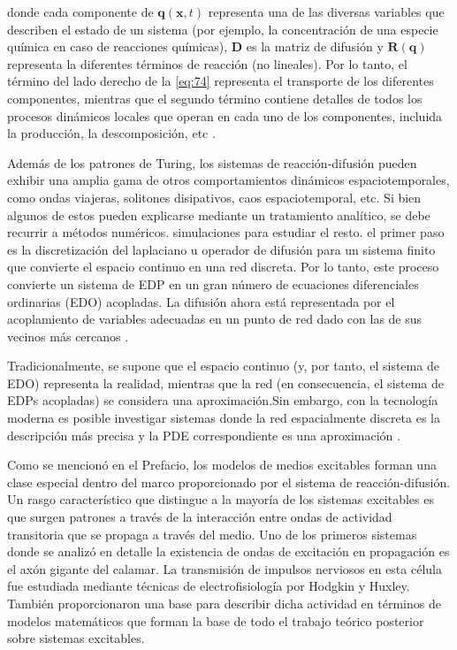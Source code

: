 donde cada componente de $\mathbf{q}(\mathbf{x},t)$ representa una de las diversas variables que describen el estado de un sistema (por ejemplo, la concentración de una especie química en caso de reacciones químicas),  $\bm{D}$  es la matriz de difusión y $\mathbf{R}(\mathbf{q})$ representa la diferentes términos de reacción (no lineales). Por lo tanto, el término del lado derecho de la \cref{eq:74} representa el transporte de los diferentes componentes, mientras que el segundo término contiene detalles de todos los procesos dinámicos locales que operan en cada uno de los componentes, incluida la producción, la descomposición, etc \cite{sinha_patterns_2019}.



Además de los patrones de Turing, los sistemas de reacción-difusión pueden exhibir una amplia gama de otros comportamientos dinámicos espaciotemporales, como ondas viajeras, solitones disipativos, caos espaciotemporal, etc. Si bien algunos de estos pueden explicarse mediante un tratamiento analítico, se debe recurrir a métodos numéricos. simulaciones para estudiar el resto. el primer paso es la discretización del laplaciano u operador de difusión para un sistema finito que convierte el espacio continuo en una red discreta. Por lo tanto, este proceso convierte un sistema de EDP en un gran número de ecuaciones diferenciales ordinarias (EDO) acopladas. La difusión ahora está representada por el acoplamiento de variables adecuadas en un punto de red dado con las de sus vecinos más cercanos \cite{sinha_patterns_2019}.






Tradicionalmente, se supone que el espacio continuo (y, por tanto, el sistema de EDO) representa la realidad, mientras que la red (en consecuencia, el sistema de EDPs acopladas) se considera una aproximación.Sin embargo, con la tecnología moderna es posible investigar sistemas donde la red espacialmente discreta es la descripción más precisa y la PDE correspondiente es una aproximación \cite{sinha_patterns_2019}.

Como se mencionó en el Prefacio, los modelos de medios excitables forman una clase especial dentro del marco proporcionado por el sistema de reacción-difusión. Un rasgo característico que distingue a la mayoría de los sistemas excitables es que surgen patrones a través de la interacción entre ondas de actividad transitoria que se propaga a través del medio. Uno de los primeros sistemas donde se analizó en detalle la existencia de ondas de excitación en propagación es el axón gigante del calamar. La transmisión de impulsos nerviosos en esta célula fue estudiada mediante técnicas de electrofisiología por Hodgkin y Huxley. También proporcionaron una base para describir dicha actividad en términos de modelos matemáticos que forman la base de todo el trabajo teórico posterior sobre sistemas excitables.



